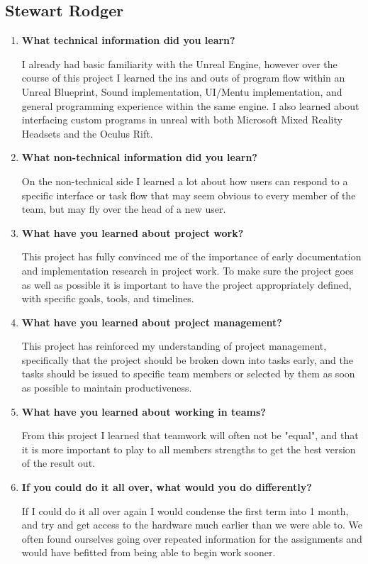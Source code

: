 \documentclass[onecolumn, draftclsnofoot,10pt, compsoc]{IEEEtran}
\begin{document}
\subsection{Stewart Rodger}
\begin{enumerate}
    \item \textbf{What technical information did you learn?}
    
    I already had basic familiarity with the Unreal Engine, however over the course of this project I learned the ins and outs of program flow within an Unreal Blueprint, Sound implementation, UI/Mentu implementation, and general programming experience within the same engine. I also learned about interfacing custom programs in unreal with both Microsoft Mixed Reality Headsets and the Oculus Rift.
    
    \item \textbf{What non-technical information did you learn?}
    
    On the non-technical side I learned a lot about how users can respond to a specific interface or task flow that may seem obvious to every member of the team, but may fly over the head of a new user. 
    
    \item \textbf{What have you learned about project work?}
    
    This project has fully convinced me of the importance of early documentation and implementation research in project work. To make sure the project goes as well as possible it is important to have the project appropriately defined, with specific goals, tools, and timelines. 
    
    \item \textbf{What have you learned about project management?}
    
    This project has reinforced my understanding of project management, specifically that the project should be broken down into tasks early, and the tasks should be issued to specific team members or selected by them as soon as possible to maintain productiveness.
    
    \item \textbf{What have you learned about working in teams?}
    
    From this project I learned that teamwork will often not be "equal", and that it is more important to play to all members strengths to get the best version of the result out.
    
    \item \textbf{If you could do it all over, what would you do differently?}
    
    If I could do it all over again I would condense the first term into 1 month, and try and get access to the hardware much earlier than we were able to. We often found ourselves going over repeated information for the assignments and would have befitted from being able to begin work sooner.
    
\end{enumerate}
\end{document}
